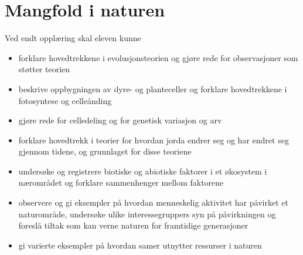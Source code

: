 \documentclass[main.tex]{subfiles}
\begin{document}
\section{Mangfold i naturen}
Ved endt opplæring skal eleven kunne
\begin{itemize}[noitemsep]
\item forklare hovedtrekkene i evolusjonsteorien og gjøre rede for observasjoner som støtter teorien
\item beskrive oppbygningen av dyre- og planteceller og forklare hovedtrekkene i fotosyntese og celleånding
\item gjøre rede for celledeling og for genetisk variasjon og arv
\item forklare hovedtrekk i teorier for hvordan jorda endrer seg og har endret seg gjennom tidene, og grunnlaget for disse teoriene
\item undersøke og registrere biotiske og abiotiske faktorer i et økosystem i nærområdet og forklare sammenhenger mellom faktorene
\item observere og gi eksempler på hvordan menneskelig aktivitet har påvirket et naturområde, undersøke ulike interessegruppers syn på påvirkningen og foreslå tiltak som kan verne naturen for framtidige generasjoner
\item gi varierte eksempler på hvordan samer utnytter ressurser i naturen
\end{itemize}
\end{document}
